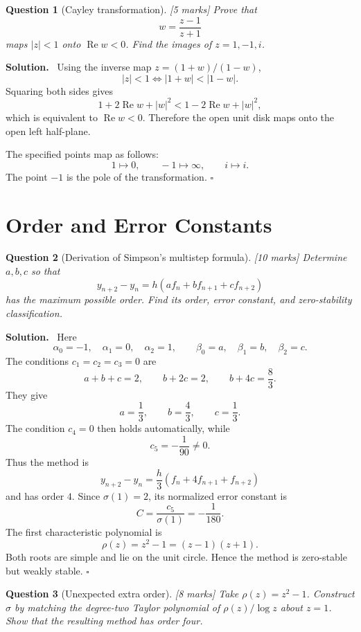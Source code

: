 \documentclass[11pt,a4paper]{article}
\theoremstyle{questionstyle}
\newtheorem{question}{Question}
\newenvironment{solution}
  {\par\noindent\textbf{\color{solutiongreen}Solution.}\ }
  {\hfill$\square$\par}
\newcommand{\pointmark}[1]{\hfill\textnormal{\textit{[#1 marks]}}}
\newcommand{\abs}[1]{\left|#1\right|}
\begin{document}
\begin{question}[Cayley transformation]\pointmark{5}
Prove that
\[
  w=\frac{z-1}{z+1}
\]
maps \(\abs z<1\) onto \(\operatorname{Re}w<0\).  Find the images of
\(z=1,-1,i\).
\end{question}

\begin{solution}
Using the inverse map \(z=(1+w)/(1-w)\),
\[
  \abs z<1
  \iff \abs{1+w}<\abs{1-w}.
\]
Squaring both sides gives
\[
  1+2\operatorname{Re}w+\abs w^2
  <1-2\operatorname{Re}w+\abs w^2,
\]
which is equivalent to \(\operatorname{Re}w<0\).  Therefore the open
unit disk maps onto the open left half-plane.

The specified points map as follows:
\[
  1\mapsto0,\qquad -1\mapsto\infty,\qquad
  i\mapsto i.
\]
The point \(-1\) is the pole of the transformation.
\end{solution}

\section{Order and Error Constants}

\begin{question}[Derivation of Simpson's multistep formula]\pointmark{10}
Determine \(a,b,c\) so that
\[
  y_{n+2}-y_n=h(af_n+bf_{n+1}+cf_{n+2})
\]
has the maximum possible order.  Find its order, error constant, and
zero-stability classification.
\end{question}

\begin{solution}
Here
\[
  \alpha_0=-1,\quad\alpha_1=0,\quad\alpha_2=1,
  \qquad
  \beta_0=a,\quad\beta_1=b,\quad\beta_2=c.
\]
The conditions \(c_1=c_2=c_3=0\) are
\[
  a+b+c=2,\qquad b+2c=2,\qquad b+4c=\frac83.
\]
They give
\[
  a=\frac13,\qquad b=\frac43,\qquad c=\frac13.
\]
The condition \(c_4=0\) then holds automatically, while
\[
  c_5=-\frac1{90}\neq0.
\]
Thus the method is
\[
  y_{n+2}-y_n
  =\frac h3(f_n+4f_{n+1}+f_{n+2})
\]
and has order \(4\).  Since \(\sigma(1)=2\), its normalized error
constant is
\[
  \boxed{C=\frac{c_5}{\sigma(1)}=-\frac1{180}}.
\]
The first characteristic polynomial is
\[
  \rho(z)=z^2-1=(z-1)(z+1).
\]
Both roots are simple and lie on the unit circle.  Hence the method is
zero-stable but weakly stable.
\end{solution}

\begin{question}[Unexpected extra order]\pointmark{8}
Take \(\rho(z)=z^2-1\).  Construct \(\sigma\) by matching the
degree-two Taylor polynomial of \(\rho(z)/\log z\) about \(z=1\).
Show that the resulting method has order four.
\end{question}
\end{document}
